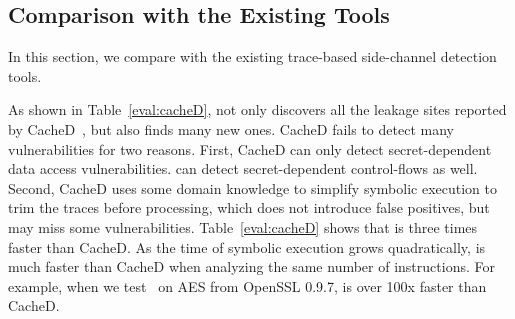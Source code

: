 \subsection{Comparison with the Existing Tools}
\label{eval:scala}

In this section, we compare \tool{} with the
existing trace-based side-channel detection tools.

As shown in Table~\ref{eval:cacheD},
\tool{} not only discovers all the leakage sites reported by CacheD~\cite{203878}, but also
finds many new ones. CacheD fails to detect many vulnerabilities for two
reasons. First, CacheD can only detect secret-dependent data access
vulnerabilities. \tool{} can detect secret-dependent control-flows as well.
Second, CacheD uses some domain
knowledge to simplify symbolic execution to trim the traces before
processing, which does not introduce false positives, but may miss some
vulnerabilities. Table~\ref{eval:cacheD} shows that
\tool{} is three times faster than CacheD. As the time of symbolic execution
grows quadratically, \tool{} is much faster than CacheD when analyzing the same
number of instructions. For example, when we test~\tool{} on AES from OpenSSL
0.9.7, \tool{} is over 100x faster than CacheD.

